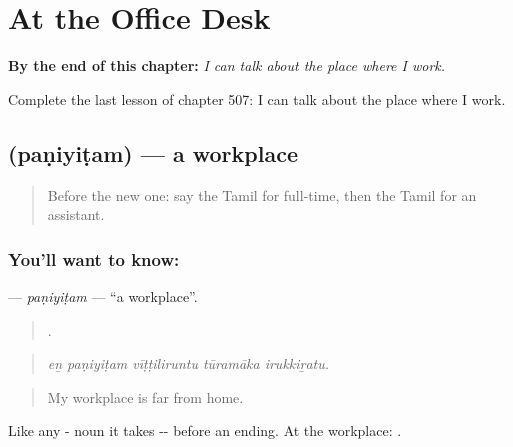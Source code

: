 
\chapter{At the Office Desk}
\label{ch:ta-at-the-office-desk}

\begin{chapteropening}
\textbf{By the end of this chapter:} \emph{I can talk about the place where I work.}

Complete the last lesson of chapter 507: I can talk about the place where I work.
\end{chapteropening}

\section[\texorpdfstring{\ta{பணியிடம்} (paṇiyiṭam)}{பணியிடம் (paṇiyiṭam)}]{ (paṇiyiṭam) — a workplace}

\label{lesson:TA-C507-paniyitam}



\begin{quote}
Before the new one: say the Tamil for full-time, then the Tamil for an assistant.
\end{quote}

\subsection*{You'll want to know: }
\textbf{} — \emph{paṇiyiṭam} — \textquotedblleft{}a workplace\textquotedblright{}.

\begin{quote}
    .
\end{quote}

\begin{quote}
\emph{eṉ paṇiyiṭam vīṭṭiliruntu tūramāka irukkiṟatu.}
\end{quote}

\begin{quote}
My workplace is far from home.
\end{quote}

Like any - noun it takes -- before an ending. At the workplace: .

